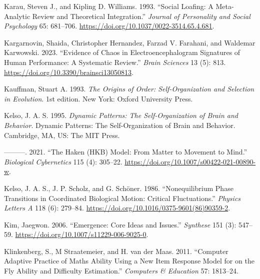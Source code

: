 \documentclass[
  a4paper,
  DIV=11,
  numbers=noendperiod]{scrreprt}
\newlength{\cslhangindent}
\newlength{\cslentryspacingunit} %
\newenvironment{CSLReferences}[2] %
 {%
  \setlength{\parindent}{0pt}
  \ifodd #1
  \let\oldpar\par
  \def\par{\hangindent=\cslhangindent\oldpar}
  \fi
  \setlength{\parskip}{#2\cslentryspacingunit}
 }%
 {}
\begin{document}
\begin{CSLReferences}{1}{0}
\leavevmode{}%
Karau, Steven J., and Kipling D. Williams. 1993. {``Social Loafing: {A}
Meta-Analytic Review and Theoretical Integration.''} \emph{Journal of
Personality and Social Psychology} 65: 681--706.
\url{https://doi.org/10.1037/0022-3514.65.4.681}.

\leavevmode{}%
Kargarnovin, Shaida, Christopher Hernandez, Farzad V. Farahani, and
Waldemar Karwowski. 2023. {``Evidence of Chaos in Electroencephalogram
Signatures of Human Performance: A Systematic Review.''} \emph{Brain
Sciences} 13 (5): 813. \url{https://doi.org/10.3390/brainsci13050813}.

\leavevmode{}%
Kauffman, Stuart A. 1993. \emph{The {Origins} of {Order}:
{Self-Organization} and {Selection} in {Evolution}}. 1st edition. {New
York}: {Oxford University Press}.

\leavevmode{}%
Kelso, J. A. S. 1995. \emph{Dynamic Patterns: {The} Self-Organization of
Brain and Behavior}. Dynamic Patterns: {The} Self-Organization of Brain
and Behavior. {Cambridge, MA, US}: {The MIT Press}.

\leavevmode{}%
---------. 2021. {``The {Haken}
({HKB}) Model: From Matter to Movement to Mind.''} \emph{Biological
Cybernetics} 115 (4): 305--22.
\url{https://doi.org/10.1007/s00422-021-00890-w}.

\leavevmode{}%
Kelso, J. A. S., J. P. Scholz, and G. Schöner. 1986. {``Nonequilibrium
Phase Transitions in Coordinated Biological Motion: Critical
Fluctuations.''} \emph{Physics Letters A} 118 (6): 279--84.
\url{https://doi.org/10.1016/0375-9601(86)90359-2}.

\leavevmode{}%
Kim, Jaegwon. 2006. {``Emergence: {Core} Ideas and Issues.''}
\emph{Synthese} 151 (3): 547--59.
\url{https://doi.org/10.1007/s11229-006-9025-0}.

\leavevmode{}%
Klinkenberg, S., M Straatemeier, and H. van der Maas. 2011. {``Computer
Adaptive Practice of {Maths} Ability Using a New Item Response Model for
on the Fly Ability and Difficulty Estimation.''} \emph{Computers \&
Education} 57: 1813--24.


\end{CSLReferences}
\end{document}
